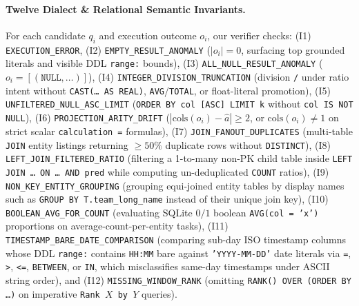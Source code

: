 \documentclass[10pt,twocolumn]{article}
\begin{document}
\paragraph{Twelve Dialect \& Relational Semantic Invariants.}
For each candidate $q_i$ and execution outcome $o_i$, our verifier checks: (I1) \texttt{EXECUTION\_\allowbreak ERROR}, (I2) \texttt{EMPTY\_\allowbreak RESULT\_\allowbreak ANOMALY} ($|o_i|=0$, surfacing top grounded literals and visible DDL \texttt{range:} bounds), (I3) \texttt{ALL\_\allowbreak NULL\_\allowbreak RESULT\_\allowbreak ANOMALY} ($o_i = [(\texttt{NULL},\dots)]$), (I4) \texttt{INTEGER\_\allowbreak DIVISION\_\allowbreak TRUNCATION} (division \texttt{/} under ratio intent without \texttt{CAST(\dots\ AS REAL)}, \texttt{AVG}/\texttt{TOTAL}, or float-literal promotion), (I5) \texttt{UNFILTERED\_\allowbreak NULL\_\allowbreak ASC\_\allowbreak LIMIT} (\texttt{ORDER BY col [ASC] LIMIT k} without \texttt{col IS NOT NULL}), (I6) \texttt{PROJECTION\_\allowbreak ARITY\_\allowbreak DRIFT} ($|\text{cols}(o_i) - \hat{a}| \ge 2$, or $\text{cols}(o_i) \ne 1$ on strict scalar \texttt{calculation =} formulas), (I7) \texttt{JOIN\_\allowbreak FANOUT\_\allowbreak DUPLICATES} (multi-table \texttt{JOIN} entity listings returning $\ge 50\%$ duplicate rows without \texttt{DISTINCT}), (I8) \texttt{LEFT\_\allowbreak JOIN\_\allowbreak FILTERED\_\allowbreak RATIO} (filtering a 1-to-many non-PK child table inside \texttt{LEFT JOIN \dots\ ON \dots\ AND pred} while computing un-deduplicated \texttt{COUNT} ratios), (I9) \texttt{NON\_\allowbreak KEY\_\allowbreak ENTITY\_\allowbreak GROUPING} (grouping equi-joined entity tables by display names such as \texttt{GROUP BY T.team\_\allowbreak long\_\allowbreak name} instead of their unique join key), (I10) \texttt{BOOLEAN\_\allowbreak AVG\_\allowbreak FOR\_\allowbreak COUNT} (evaluating SQLite $0/1$ boolean \texttt{AVG(col = 'x')} proportions on average-count-per-entity tasks), (I11) \texttt{TIMESTAMP\_\allowbreak BARE\_\allowbreak DATE\_\allowbreak COMPARISON} (comparing sub-day ISO timestamp columns whose DDL \texttt{range:} contains \texttt{HH:MM} bare against \texttt{'YYYY-MM-DD'} date literals via \texttt{=}, \texttt{>}, \texttt{<=}, \texttt{BETWEEN}, or \texttt{IN}, which misclassifies same-day timestamps under ASCII string order), and (I12) \texttt{MISSING\_\allowbreak WINDOW\_\allowbreak RANK} (omitting \texttt{RANK() OVER (ORDER BY \dots)} on imperative \texttt{Rank $X$ by $Y$} queries).
\end{document}
